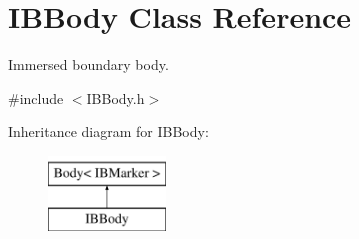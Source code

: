 \hypertarget{class_i_b_body}{}\section{I\+B\+Body Class Reference}
\label{class_i_b_body}


Immersed boundary body.  




{\ttfamily \#include $<$I\+B\+Body.\+h$>$}

Inheritance diagram for I\+B\+Body\+:\begin{figure}[H]
\begin{center}
\leavevmode
\includegraphics[height=2.000000cm]{class_i_b_body}
\end{center}
\end{figure}
